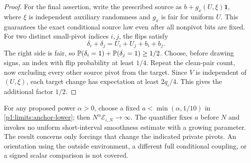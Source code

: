 \begin{proof}
For the final assertion, write the prescribed source as
$b+g_x(U,\xi)\boldsymbol1$, where $\xi$ is independent
auxiliary randomness and $g_x$ is fair for uniform $U$.
This guarantees the exact conditional source law even
after all nonpivot bits are fixed.  For two distinct
small-pivot indices $i,j$, the flips satisfy
\[
 \delta_i+\delta_j=U_i+U_j+b_i+b_j.
\]
The right side is fair, so
$\P(\delta_i=1)+\P(\delta_j=1)\ge1/2$.
Choose, before drawing signs, an index with flip
probability at least $1/4$.  Repeat the clean-pair count,
now excluding every other source pivot from the target.
Since $V$ is independent of $(U,\xi)$, each target
change has expectation at least $2q_\iota/4$.
This gives the additional factor $1/2$.
\end{proof}

For any proposed power $\alpha>0$, choose a fixed
$a<\min(\alpha,1/10)$ in
\eqref{p1:limits:anchor-lower}; then
$N^\alpha\mathcal E_{\iota,N}\to\infty$.
The quantifier fixes $a$ before $N$ and invokes no
uniform short-interval smoothness estimate with a growing
parameter.  The result concerns only forcings that change
the indicated private pivots.  An orientation using the
outside environment, a different full conditional coupling,
or a signed scalar comparison is not covered.

